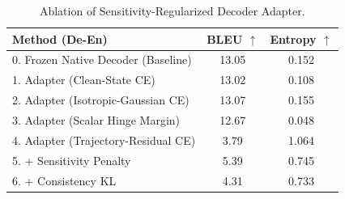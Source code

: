 \begin{table}[h]
\centering
\begin{tabular}{lcc}
\hline
\textbf{Method (De-En)} & \textbf{BLEU} $\uparrow$ & \textbf{Entropy} $\uparrow$ \\
\hline
0. Frozen Native Decoder (Baseline) & 13.05 & 0.152 \\
1. Adapter (Clean-State CE) & 13.02 & 0.108 \\
2. Adapter (Isotropic-Gaussian CE) & 13.07 & 0.155 \\
3. Adapter (Scalar Hinge Margin) & 12.67 & 0.048 \\
4. Adapter (Trajectory-Residual CE) & 3.79 & 1.064 \\
5. \quad + Sensitivity Penalty & 5.39 & 0.745 \\
6. \quad + Consistency KL & 4.31 & 0.733 \\
\hline
\end{tabular}
\caption{Ablation of Sensitivity-Regularized Decoder Adapter.}
\label{tab:ablation}
\end{table}
